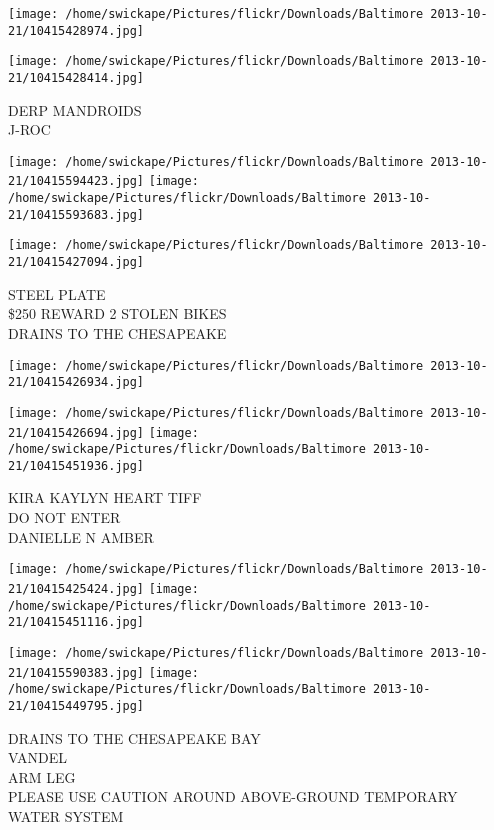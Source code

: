 \documentclass[10pt,letterpaper]{article}
\begin{document}
\texttt{[image: /home/swickape/Pictures/flickr/Downloads/Baltimore 2013-10-21/10415428974.jpg]}

\vspace{0.25in}
\texttt{[image: /home/swickape/Pictures/flickr/Downloads/Baltimore 2013-10-21/10415428414.jpg]}

DERP MANDROIDS\\
J{-}ROC\\
\pagebreak

\texttt{[image: /home/swickape/Pictures/flickr/Downloads/Baltimore 2013-10-21/10415594423.jpg]}
\texttt{[image: /home/swickape/Pictures/flickr/Downloads/Baltimore 2013-10-21/10415593683.jpg]}

\vspace{0.25in}
\texttt{[image: /home/swickape/Pictures/flickr/Downloads/Baltimore 2013-10-21/10415427094.jpg]}

STEEL PLATE\\
\$250 REWARD 2 STOLEN BIKES\\
DRAINS TO THE CHESAPEAKE\\
\pagebreak

\texttt{[image: /home/swickape/Pictures/flickr/Downloads/Baltimore 2013-10-21/10415426934.jpg]}

\vspace{0.25in}
\texttt{[image: /home/swickape/Pictures/flickr/Downloads/Baltimore 2013-10-21/10415426694.jpg]}
\texttt{[image: /home/swickape/Pictures/flickr/Downloads/Baltimore 2013-10-21/10415451936.jpg]}

KIRA KAYLYN HEART TIFF\\
DO NOT ENTER\\
DANIELLE N AMBER\\
\pagebreak

\texttt{[image: /home/swickape/Pictures/flickr/Downloads/Baltimore 2013-10-21/10415425424.jpg]}
\texttt{[image: /home/swickape/Pictures/flickr/Downloads/Baltimore 2013-10-21/10415451116.jpg]}

\texttt{[image: /home/swickape/Pictures/flickr/Downloads/Baltimore 2013-10-21/10415590383.jpg]}
\texttt{[image: /home/swickape/Pictures/flickr/Downloads/Baltimore 2013-10-21/10415449795.jpg]}

DRAINS TO THE CHESAPEAKE BAY\\
VANDEL\\
ARM LEG\\
PLEASE USE CAUTION AROUND ABOVE{-}GROUND TEMPORARY WATER SYSTEM\\
\pagebreak
\end{document}
